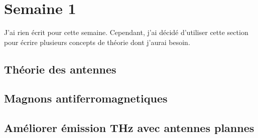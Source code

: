 \section{Semaine 1}

J'ai rien écrit pour cette semaine. Cependant, j'ai décidé d'utiliser cette section pour écrire plusieurs concepts de théorie dont j'aurai besoin.

\subsection{Théorie des antennes}

\subsection{Magnons antiferromagnetiques}

\subsection{Améliorer émission THz avec antennes plannes}